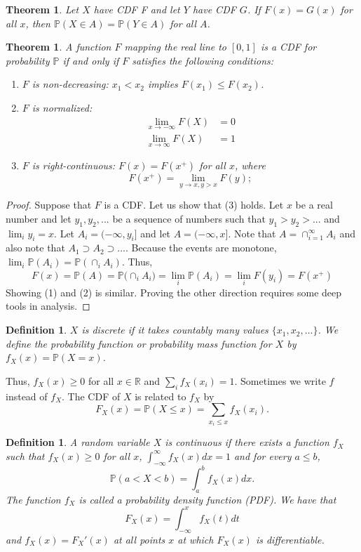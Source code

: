 \documentclass{article}
\newtheorem{theorem}[counter]{Theorem}
\newtheorem{definition}[counter]{Definition}
\theoremstyle{remark}
\newcommand{\1}{\mathbf{1}}
\newcommand{\Prob}{\mathbb{P}}
\newcommand{\R}{\mathbb{R}}
\begin{document}
\begin{theorem}
	Let $X$ have CDF F and let $Y$ have CDF $G$. If $F(x) = G(x)$ for all $x$, then $\Prob(X \in A) = \Prob(Y \in A)$ for all $A$.
\end{theorem}

\begin{theorem}
	A function $F$ mapping the real line to $[0,1]$ is a CDF for probability $\Prob$ if and only if $F$ satisfies the following conditions:
	\begin{enumerate}
		\item $F$ is non-decreasing: $x_1 < x_2$ implies $F(x_1) \leq F(x_2)$.
		\item $F$ is normalized:
		\[
		\begin{split}
		\lim_{x \to -\infty} F(X) &= 0 \\
		\lim_{x \to \infty} F(X) &= 1
		\end{split}
		\]
		\item $F$ is right-continuous: $F(x) = F(x^+)$ for all $x$, where
		\[
		F(x^+) = \lim_{y \to x, y >x} F(y);
		\]
	\end{enumerate}
\end{theorem}
\begin{proof}
	Suppose that $F$ is a CDF. Let us show that (3) holds. Let $x$ be a real number and let $y_1, y_2, ...$ be a sequence of numbers such that $y_1 > y_2 > ...$ and $\lim_i y_i = x$. Let $A_i = (-\infty, y_i]$ and let $A = (-\infty,x]$. Note that $A = \cap_{i=1}^{\infty} A_i$ and also note that $A_1 \supset A_2 \supset ...$. Because the events are monotone, $\lim_i \Prob(A_i) = \Prob(\cap_i A_i)$. Thus,
	\[
	F(x) = \Prob(A) = \Prob\Big( \cap_i A_i \Big) = \lim_i \Prob(A_i) =\lim_i F(y_i) = F(x^+)
	\]
	Showing (1) and (2) is similar. Proving the other direction requires some deep tools in analysis.  
\end{proof}

\begin{definition}
	$X$ is discrete if it takes countably many values $\{x_1, x_2, ...\}$. We define the probability function or probability mass function for $X$ by $f_X(x) = \Prob(X = x)$.
\end{definition}
Thus, $f_X(x) \geq 0$ for all $x \in \R$ and $\sum_i f_X(x_i) = 1$. Sometimes we write $f$ instead of $f_X$. The CDF of $X$ is related to $f_X$ by 
\[
F_X(x) = \Prob(X \leq x) = \sum_{x_i \leq x} f_X(x_i).
\]

\begin{definition}
	A random variable $X$ is continuous if there exists a function $f_X$ such that $f_X(x) \geq 0$ for all $x$, $\int_{-\infty}^{\infty}f_X(x)dx = 1$ and for every $a \leq b$,
	\[
	\Prob(a < X < b) = \int_a^b f_X(x) dx.
	\]
	The function $f_X$ is called a probability density function (PDF). We have that
	\[
	F_X(x) = \int_{-\infty}^x f_X(t)dt
	\]
	and $f_X(x) = F_X'(x)$ at all points $x$ at which $F_X(x)$ is differentiable.
\end{definition}
\end{document}
